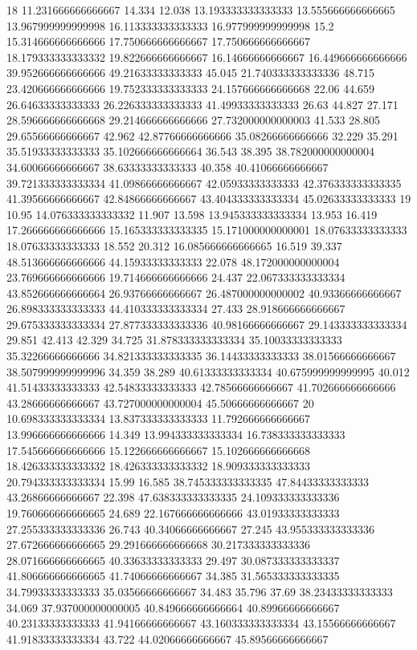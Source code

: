 18 11.231666666666667 14.334 12.038 13.193333333333333 13.555666666666665 13.967999999999998 16.113333333333333 16.977999999999998 15.2 15.314666666666666 17.750666666666667 17.750666666666667 18.179333333333332 19.822666666666667 16.14666666666667 16.449666666666666 39.952666666666666 49.21633333333333 45.045 21.740333333333336 48.715 23.420666666666666 19.752333333333333 24.157666666666668 22.06 44.659 26.64633333333333 26.226333333333333 41.49933333333333 26.63 44.827 27.171 28.596666666666668 29.214666666666666 27.732000000000003 41.533 28.805 29.65566666666667 42.962 42.87766666666666 35.08266666666666 32.229 35.291 35.51933333333333 35.102666666666664 36.543 38.395 38.782000000000004 34.60066666666667 38.63333333333333 40.358 40.41066666666667 39.721333333333334 41.09866666666667 42.05933333333333 42.376333333333335 41.39566666666667 42.84866666666667 43.404333333333334 45.02633333333333
19 10.95 14.076333333333332 11.907 13.598 13.945333333333334 13.953 16.419 17.266666666666666 15.165333333333335 15.171000000000001 18.07633333333333 18.07633333333333 18.552 20.312 16.085666666666665 16.519 39.337 48.513666666666666 44.15933333333333 22.078 48.172000000000004 23.769666666666666 19.714666666666666 24.437 22.067333333333334 43.852666666666664 26.93766666666667 26.487000000000002 40.93366666666667 26.898333333333333 44.410333333333334 27.433 28.918666666666667 29.675333333333334 27.877333333333336 40.98166666666667 29.143333333333334 29.851 42.413 42.329 34.725 31.878333333333334 35.10033333333333 35.32266666666666 34.821333333333335 36.14433333333333 38.01566666666667 38.507999999999996 34.359 38.289 40.61333333333334 40.675999999999995 40.012 41.51433333333333 42.54833333333333 42.78566666666667 41.702666666666666 43.28666666666667 43.727000000000004 45.50666666666667
20 10.698333333333334 13.837333333333333 11.792666666666667 13.996666666666666 14.349 13.994333333333334 16.738333333333333 17.545666666666666 15.122666666666667 15.102666666666668 18.426333333333332 18.426333333333332 18.909333333333333 20.794333333333334 15.99 16.585 38.745333333333335 47.84433333333333 43.26866666666667 22.398 47.638333333333335 24.109333333333336 19.760666666666665 24.689 22.167666666666666 43.01933333333333 27.255333333333336 26.743 40.34066666666667 27.245 43.955333333333336 27.672666666666665 29.291666666666668 30.217333333333336 28.071666666666665 40.33633333333333 29.497 30.087333333333337 41.806666666666665 41.74066666666667 34.385 31.565333333333335 34.79933333333333 35.03566666666667 34.483 35.796 37.69 38.23433333333333 34.069 37.937000000000005 40.849666666666664 40.89966666666667 40.23133333333333 41.94166666666667 43.160333333333334 43.15566666666667 41.91833333333334 43.722 44.02066666666667 45.89566666666667
